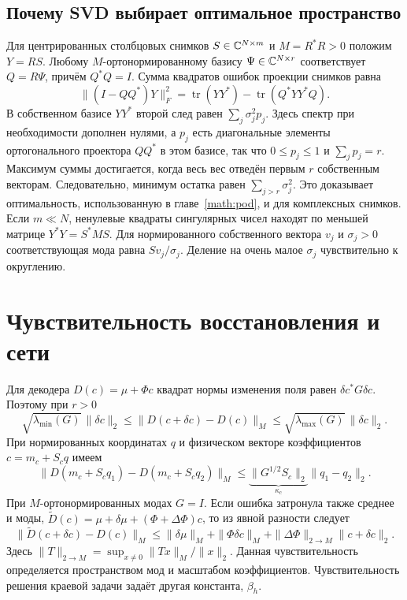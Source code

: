 \subsection{Почему SVD выбирает оптимальное пространство}
\label{rig:pod-optimality}
Для центрированных столбцовых снимков $S\in\mathbb{C}^{N\times m}$ и
$M=R^*R>0$ положим $Y=RS$. Любому $M$-ортонормированному базису
$\Psi\in\mathbb{C}^{N\times r}$ соответствует $Q=R\Psi$, причём $Q^*Q=I$.
Сумма квадратов ошибок проекции снимков равна
\[
 \|(I-QQ^*)Y\|_F^2=\operatorname{tr}(YY^*)-
                              \operatorname{tr}(Q^*YY^*Q).
\]
В собственном базисе $YY^*$ второй след равен $\sum_j\sigma_j^2p_j$.
Здесь спектр при необходимости дополнен нулями, а $p_j$ есть диагональные
элементы ортогонального проектора $QQ^*$ в этом базисе, так что
$0\le p_j\le1$ и $\sum_jp_j=r$. Максимум суммы достигается, когда весь
вес отведён первым $r$ собственным векторам. Следовательно, минимум
остатка равен $\sum_{j>r}\sigma_j^2$. Это доказывает оптимальность,
использованную в главе~\ref{math:pod}, и для комплексных снимков.
Если $m\ll N$, ненулевые квадраты сингулярных чисел находят по меньшей
матрице $Y^*Y=S^*MS$. Для нормированного собственного вектора $v_j$ и
$\sigma_j>0$ соответствующая мода равна $Sv_j/\sigma_j$.
Деление на очень малое $\sigma_j$ чувствительно к округлению.

\section{Чувствительность восстановления и сети}
\label{rig:decoder-stability}

Для декодера $D(c)=\mu+\Phi c$ квадрат нормы изменения поля равен
$\delta c^*G\delta c$. Поэтому при $r>0$
\begin{equation}
 \sqrt{\lambda_{\min}(G)}\,\|\delta c\|_2
 \le\|D(c+\delta c)-D(c)\|_M
 \le\sqrt{\lambda_{\max}(G)}\,\|\delta c\|_2.\label{rig:decoder-conditioning}
\end{equation}
При нормированных координатах $q$ и физическом векторе коэффициентов
$c=m_c+S_c q$ имеем
\begin{equation}
 \|D(m_c+S_c q_1)-D(m_c+S_c q_2)\|_M
 \le\underbrace{\|G^{1/2}S_c\|_2}_{\kappa_c}\|q_1-q_2\|_2.
 \label{rig:scaled-decoder}
\end{equation}
При $M$-ортонормированных модах $G=I$. Если ошибка затронула также
среднее и моды, $\widetilde D(c)=\mu+\delta\mu+(\Phi+\Delta\Phi)c$,
то из явной разности следует
\begin{equation}
 \|\widetilde D(c+\delta c)-D(c)\|_M
 \le\|\delta\mu\|_M+\|\Phi\delta c\|_M
 +\|\Delta\Phi\|_{2\to M}\|c+\delta c\|_2.
 \label{rig:decoder-perturb}
\end{equation}
Здесь $\|T\|_{2\to M}=\sup_{x\ne0}\|Tx\|_M/\|x\|_2$. Данная
чувствительность определяется пространством мод и масштабом коэффициентов.
Чувствительность решения краевой задачи задаёт другая константа, $\beta_h$.


